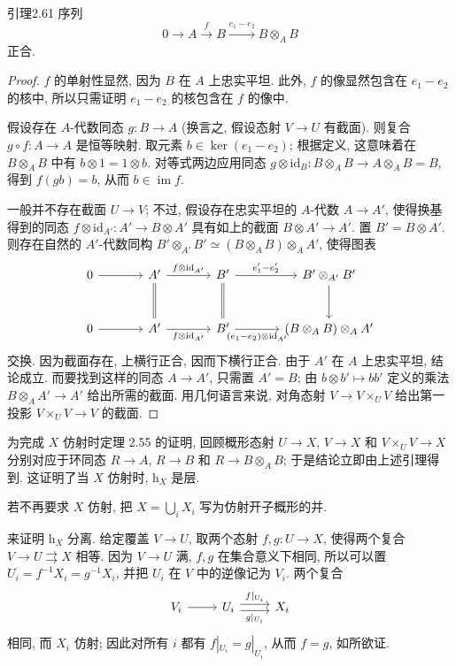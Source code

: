 \begin{origstatement}{引理}{2.61}\label{ch02:lem261}
序列
\[
0\longrightarrow A\xrightarrow fB\xrightarrow{e_1-e_2}B\otimes_AB
\]
正合.
\end{origstatement}
\begin{proof}
$f$ 的单射性显然, 因为 $B$ 在 $A$ 上忠实平坦. 此外, $f$ 的像显然包含在 $e_1-e_2$ 的核中, 所以只需证明 $e_1-e_2$ 的核包含在 $f$ 的像中.

假设存在 $A$-代数同态 $g:B\to A$ (换言之, 假设态射 $V\to U$ 有截面). 则复合 $g\circ f:A\to A$ 是恒等映射. 取元素 $b\in\ker(e_1-e_2)$; 根据定义, 这意味着在 $B\otimes_AB$ 中有 $b\otimes1=1\otimes b$. 对等式两边应用同态 $g\otimes\mathrm{id}_B:B\otimes_A
B\to A\otimes_AB=B$, 得到 $f(gb)=b$, 从而 $b\in\operatorname{im}f$.

一般并不存在截面 $U\to V$; 不过, 假设存在忠实平坦的 $A$-代数 $A\to A'$, 使得换基得到的同态 $f\otimes\mathrm{id}_{A'}:A'\to B\otimes A'$ 具有如上的截面 $B\otimes A'\to A'$. 置 $B'=B\otimes A'$. 则存在自然的 $A'$-代数同构 $B'\otimes_{A'}B'\simeq(B\otimes_AB)\otimes_AA'$, 使得图表
\[
\begin{tikzcd}[column sep=large,row sep=large]
0\arrow[r]&A'\arrow[r,"f\otimes\mathrm{id}_{A'}"]\arrow[d,equal]&B'\arrow[r,"e'_1-e'_2"]\arrow[d,equal]&B'\otimes_{A'}B'\arrow[d]\\
0\arrow[r]&A'\arrow[r,"f\otimes\mathrm{id}_{A'}"']&B'\arrow[r,"(e_1-e_2)\otimes\mathrm{id}_{A'}"']&(B\otimes_AB)\otimes_AA'
\end{tikzcd}
\]
交换. 因为截面存在, 上横行正合, 因而下横行正合. 由于 $A'$ 在 $A$ 上忠实平坦, 结论成立. 而要找到这样的同态 $A\to A'$, 只需置 $A'=B$; 由 $b\otimes b'\mapsto bb'$ 定义的乘法 $B\otimes_AA'\to A'$ 给出所需的截面. 用几何语言来说, 对角态射 $V\to V\times_UV$ 给出第一投影 $V\times_UV\to V$ 的截面.
\end{proof}

为完成 $X$ 仿射时定理 2.55 的证明, 回顾概形态射 $U\to X$, $V\to X$ 和 $V\times_UV\to X$ 分别对应于环同态 $R\to A$, $R\to B$ 和 $R\to B\otimes_AB$; 于是结论立即由上述引理得到. 这证明了当 $X$ 仿射时, $\mathrm h_X$ 是层.

若不再要求 $X$ 仿射, 把 $X=\bigcup_iX_i$ 写为仿射开子概形的并.

来证明 $\mathrm h_X$ 分离. 给定覆盖 $V\to U$, 取两个态射 $f,g:U\to X$, 使得两个复合 $V\to U\rightrightarrows X$ 相等. 因为 $V\to U$ 满, $f,g$ 在集合意义下相同, 所以可以置 $U_i=f^{-1}X_i=g^{-1}X_i$, 并把 $U_i$ 在 $V$ 中的逆像记为 $V_i$. 两个复合
\[
\begin{tikzcd}
V_i\arrow[r]&U_i\arrow[r,shift left=.6ex,"f|_{U_i}"]\arrow[r,shift right=.6ex,"g|_{U_i}"']&X_i
\end{tikzcd}
\]
相同, 而 $X_i$ 仿射; 因此对所有 $i$ 都有 $f|_{U_i}=g|_{U_i}$, 从而 $f=g$, 如所欲证.

